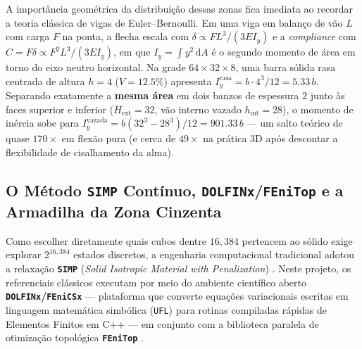 \documentclass[11pt,a4paper]{article}
\begin{document}
A importância geométrica da distribuição dessas zonas fica imediata ao recordar a teoria clássica de vigas de Euler--Bernoulli. Em uma viga em balanço de vão $L$ com carga $F$ na ponta, a flecha escala com $\delta \propto F L^3 / (3 E I_y)$ e a \emph{compliance} com $C = F\delta \propto F^2 L^3 / (3 E I_y)$, em que $I_y = \int y^2\,\mathrm{d}A$ é o segundo momento de área em torno do eixo neutro horizontal. Na grade $64 \times 32 \times 8$, uma barra sólida rasa centrada de altura $h = 4$ ($V = 12.5\%$) apresenta $I_y^{\mathrm{rasa}} = b \cdot 4^3 / 12 = 5.33\,b$. Separando exatamente a \textbf{mesma área} em dois banzos de espessura $2$ junto às faces superior e inferior ($H_{\mathrm{ext}} = 32$, vão interno vazado $h_{\mathrm{int}} = 28$), o momento de inércia sobe para $I_y^{\mathrm{vazada}} = b(32^3 - 28^3)/12 = 901.33\,b$ — um salto teórico de quase $170\times$ em flexão pura (e cerca de $49\times$ na prática 3D após descontar a flexibilidade de cisalhamento da alma).

\subsection{O Método \texttt{SIMP} Contínuo, \texttt{DOLFINx}/\texttt{FEniTop} e a Armadilha da Zona Cinzenta}

Como escolher diretamente quais cubos dentre $16{,}384$ pertencem ao sólido exige explorar $2^{16{,}384}$ estados discretos, a engenharia computacional tradicional adotou a relaxação \textbf{\texttt{SIMP}} (\emph{Solid Isotropic Material with Penalization}) \citep{bendsoe2003topology,sigmund200199line,sigmund2013topology,liu2014efficient,ferrari2020new}. Neste projeto, os referenciais clássicos executam por meio do ambiente científico aberto \textbf{\texttt{DOLFINx}/\texttt{FEniCSx}} \citep{baratta2023dolfinx} — plataforma que converte equações variacionais escritas em linguagem matemática simbólica (\texttt{UFL}) para rotinas compiladas rápidas de Elementos Finitos em C++ — em conjunto com a biblioteca paralela de otimização topológica \textbf{\texttt{FEniTop}} \citep{jia2024fenitop}.
\end{document}
